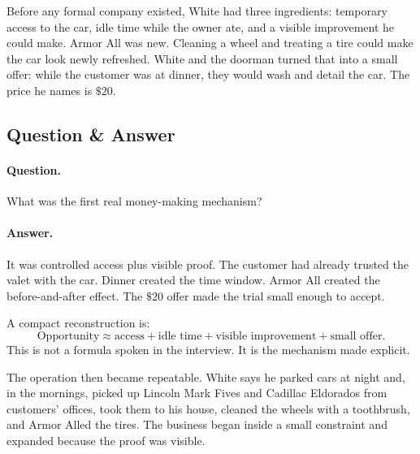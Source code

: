 Before any formal company existed, White had three ingredients: temporary access to the car, idle time while the owner ate, and a visible improvement he could make. Armor All was new. Cleaning a wheel and treating a tire could make the car look newly refreshed. White and the doorman turned that into a small offer: while the customer was at dinner, they would wash and detail the car. The price he names is \(\$20\).

\subsection{Question \& Answer}

\paragraph{Question.} What was the first real money-making mechanism?

\paragraph{Answer.} It was controlled access plus visible proof. The customer had already trusted the valet with the car. Dinner created the time window. Armor All created the before-and-after effect. The \(\$20\) offer made the trial small enough to accept.

A compact reconstruction is:
\begin{equation}
\text{Opportunity}
\approx
\text{access}
+
\text{idle time}
+
\text{visible improvement}
+
\text{small offer}.
\end{equation}
This is not a formula spoken in the interview. It is the mechanism made explicit.

The operation then became repeatable. White says he parked cars at night and, in the mornings, picked up Lincoln Mark Fives and Cadillac Eldorados from customers' offices, took them to his house, cleaned the wheels with a toothbrush, and Armor Alled the tires. The business began inside a small constraint and expanded because the proof was visible.

